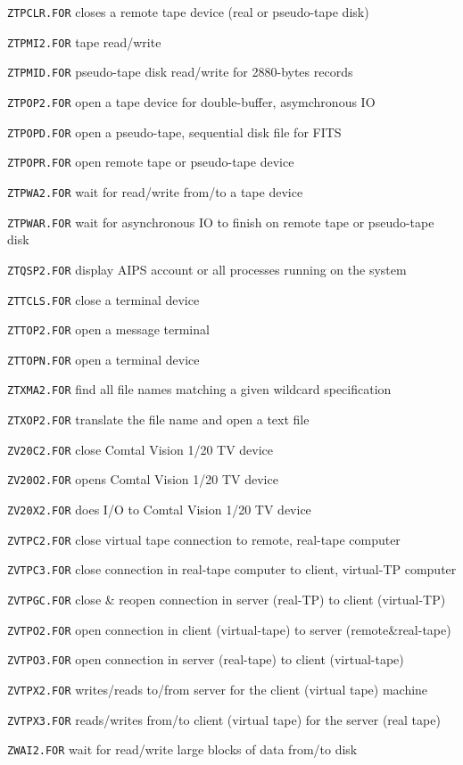 {\item{\tt ZTPCLR.FOR} closes a remote tape device (real or pseudo-tape disk)
\item{\tt ZTPMI2.FOR} tape read/write
\item{\tt ZTPMID.FOR} pseudo-tape disk read/write for 2880-bytes records
\item{\tt ZTPOP2.FOR} open a tape device for double-buffer, asymchronous IO
\item{\tt ZTPOPD.FOR} open a pseudo-tape, sequential disk file for FITS
\item{\tt ZTPOPR.FOR} open  remote tape or pseudo-tape device
\item{\tt ZTPWA2.FOR} wait for read/write from/to a tape device
\item{\tt ZTPWAR.FOR} wait for asynchronous IO to finish on remote tape or pseudo-tape disk
\item{\tt ZTQSP2.FOR} display AIPS account or all processes running on the system
\item{\tt ZTTCLS.FOR} close a terminal device
\item{\tt ZTTOP2.FOR} open a message terminal
\item{\tt ZTTOPN.FOR} open a terminal device
\item{\tt ZTXMA2.FOR} find all file names matching a given wildcard specification
\item{\tt ZTXOP2.FOR} translate the file name and open a text file
\item{\tt ZV20C2.FOR} close Comtal Vision 1/20 TV device
\item{\tt ZV20O2.FOR} opens Comtal Vision 1/20 TV device
\item{\tt ZV20X2.FOR} does I/O to Comtal Vision 1/20 TV device
\item{\tt ZVTPC2.FOR} close virtual tape connection to remote, real-tape computer
\item{\tt ZVTPC3.FOR} close connection in real-tape computer to client, virtual-TP computer
\item{\tt ZVTPGC.FOR} close \& reopen connection in server (real-TP) to client (virtual-TP)
\item{\tt ZVTPO2.FOR} open connection in client (virtual-tape) to server (remote\&real-tape)
\item{\tt ZVTPO3.FOR} open connection in server (real-tape) to client (virtual-tape)
\item{\tt ZVTPX2.FOR} writes/reads to/from server for the client (virtual tape) machine
\item{\tt ZVTPX3.FOR} reads/writes from/to client (virtual tape) for the server (real tape)
\item{\tt ZWAI2.FOR} wait for read/write large blocks of data from/to disk
}
\vfill\eject %

